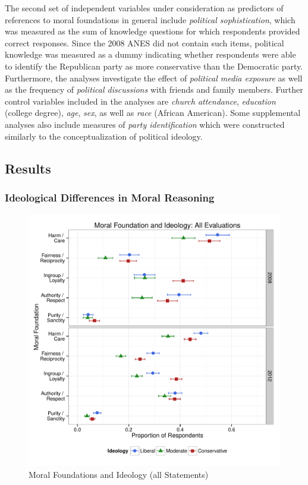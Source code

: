 \documentclass[12pt]{paper}
\begin{document}
The second set of independent variables under consideration as predictors of references to moral foundations in general include \textit{political sophistication}, which was measured as the sum of knowledge questions for which respondents provided correct responses. Since the 2008 ANES did not contain such items, political knowledge was measured as a dummy indicating whether respondents were able to identify the Republican party as more conservative than the Democratic party. Furthermore, the analyses investigate the effect of \textit{political media exposure} as well as the frequency of \textit{political discussions} with friends and family members. Further control variables included in the analyses are \textit{church attendance}, \textit{education} (college degree), \textit{age}, \textit{sex}, as well as \textit{race} (African American). Some supplemental analyses also include measures of \textit{party identification} which were constructed similarly to the conceptualization of political ideology.


\subsection{Results}

\subsubsection{Ideological Differences in Moral Reasoning}

\begin{figure}[ht]\centering
\includegraphics[scale=.6]{../calc/fig/p1_mft_ideol.pdf}
\caption{Moral Foundations and Ideology (all Statements)}\label{fig:mft_ideol}
\end{figure}
\end{document}
